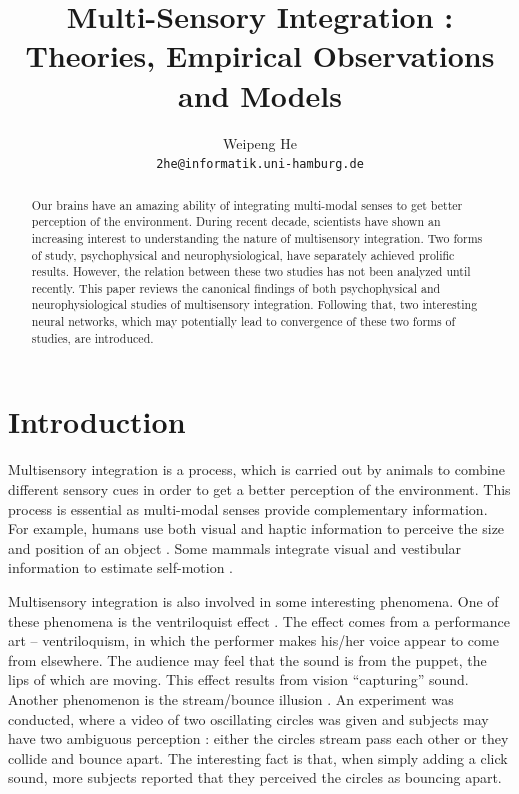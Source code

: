 \documentclass{article}[11pt]
\title{Multi-Sensory Integration : Theories, Empirical Observations and Models}
\author{Weipeng He \\ \texttt{2he@informatik.uni-hamburg.de}}
\begin{document}
\maketitle

\begin{abstract}
  Our brains have an amazing ability of integrating multi-modal senses to get better perception of the environment. During recent decade, scientists have shown an increasing interest to understanding the nature of multisensory integration. Two forms of study, psychophysical and neurophysiological, have separately achieved prolific results. However, the relation between these two studies has not been analyzed until recently. 
  This paper reviews the canonical findings of both psychophysical and neurophysiological studies of multisensory integration. Following that, two interesting neural networks, which may potentially lead to convergence of these two forms of studies, are introduced.
\end{abstract}

\section{Introduction}
\label{sec:intro}

Multisensory integration is a process, which is carried out by animals to combine different sensory cues in order to get a better perception of the environment. This process is essential as multi-modal senses provide complementary information.
For example, humans use both visual and haptic information to perceive the size and position of an object \cite{ernst_humans_2002}. Some mammals integrate visual and vestibular information to estimate self-motion \cite{gu_visual_2006}.

Multisensory integration is also involved in some interesting phenomena. One of these phenomena is the ventriloquist effect \cite{alais_ventriloquist_2004}. The effect comes from a performance art -- ventriloquism, in which the performer makes his/her voice appear to come from elsewhere. The audience may feel that the sound is from the puppet, the lips of which are moving. This effect results from vision ``capturing'' sound.
Another phenomenon is the stream/bounce illusion \cite{sekuler_sound_1997}. An experiment was conducted, where a video of two oscillating circles was given and subjects may have two ambiguous perception : either the circles stream pass each other or they collide and bounce apart. The interesting fact is that, when simply adding a click sound, more subjects reported that they perceived the circles as bouncing apart.
\end{document}
